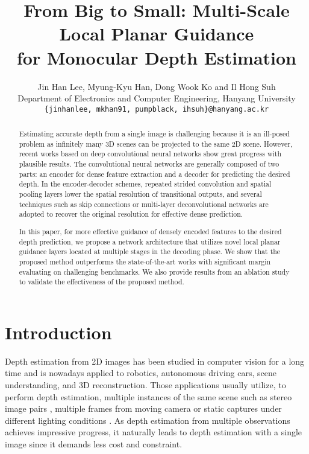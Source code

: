 \documentclass[10pt,twocolumn,letterpaper]{article}
\begin{document}
\title{From Big to Small: Multi-Scale Local Planar Guidance \\ for Monocular Depth Estimation}

\author{Jin Han Lee, Myung-Kyu Han, Dong Wook Ko and Il Hong Suh\\
	Department of Electronics and Computer Engineering, Hanyang University\\
{\tt\small \{jinhanlee, mkhan91, pumpblack, ihsuh\}@hanyang.ac.kr}
}

\maketitle


\begin{abstract}	
Estimating accurate depth from a single image is challenging because it is an ill-posed problem as infinitely many 3D scenes can be projected to the same 2D scene.
However, recent works based on deep convolutional neural networks show great progress with plausible results.
The convolutional neural networks are generally composed of two parts: an encoder for dense feature extraction and a decoder for predicting the desired depth.
In the encoder-decoder schemes, repeated strided convolution and spatial pooling layers lower the spatial resolution of transitional outputs, and several techniques such as skip connections or multi-layer deconvolutional networks are adopted to recover the original resolution for effective dense prediction.

In this paper, for more effective guidance of densely encoded features to the desired depth prediction, we propose a network architecture that utilizes novel local planar guidance layers located at multiple stages in the decoding phase.
We show that the proposed method outperforms the state-of-the-art works with significant margin evaluating on challenging benchmarks.
We also provide results from an ablation study to validate the effectiveness of the proposed method.	
\end{abstract}

\section{Introduction}
Depth estimation from 2D images has been studied in computer vision for a long time and is nowadays applied to robotics, autonomous driving cars, scene understanding, and 3D reconstruction.
Those applications usually utilize, to perform depth estimation, multiple instances of the same scene such as stereo image pairs \cite{scharstein2002taxonomy}, multiple frames from moving camera \cite{ranftl2016dense} or static captures under different lighting conditions \cite{abrams2012heliometric,basri2007photometric}.
As depth estimation from multiple observations achieves impressive progress, it naturally leads to depth estimation with a single image since it demands less cost and constraint.
\end{document}
